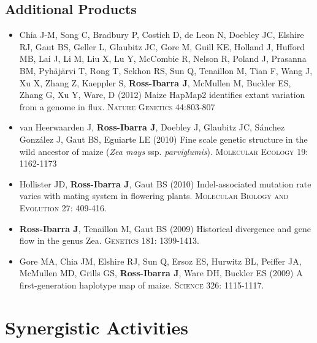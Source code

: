 \documentclass[11pt]{article}
\begin{document}
\subsection*{Additional Products}

\begin{itemize} \setlength{\itemsep}{0pt} \setlength{\parskip}{2pt} \setlength{\parsep}{0pt}

\item  Chia J-M, Song C, Bradbury P, Costich D, de Leon N, Doebley JC, Elshire RJ, Gaut BS, Geller L, Glaubitz JC, Gore M, Guill KE, Holland J,  {Hufford MB}, Lai J, Li M, Liu X, Lu Y, McCombie R, Nelson R, Poland J, Prasanna BM,  {Pyh\"aj\"arvi T}, Rong T, Sekhon RS,  Sun Q, Tenaillon M, Tian F, Wang J, Xu X, Zhang Z, Kaeppler S, {\bf Ross-Ibarra J}, McMullen M, Buckler ES, Zhang G, Xu Y, Ware, D (2012) Maize HapMap2 identifies extant variation from a genome in flux. \textsc{Nature Genetics} 44:803-807

\item {van Heerwaarden J}, {\bf Ross-Ibarra J}, Doebley J, Glaubitz JC, S\'{a}nchez Gonz\'{a}lez J, Gaut BS, Eguiarte LE (2010) Fine scale genetic structure in the wild ancestor of maize (\emph{Zea mays} ssp. \emph{parviglumis}).  \textsc{Molecular Ecology} 19: 1162-1173

\item Hollister JD, {\bf Ross-Ibarra J}, Gaut BS (2010) Indel-associated mutation rate varies with mating system in flowering plants.  \textsc{Molecular Biology and Evolution} 27: 409-416.

\item {\bf Ross-Ibarra J}, Tenaillon M, Gaut BS (2009) Historical divergence and gene flow in the genus Zea.  \textsc{Genetics} 181: 1399-1413.

\item Gore MA, Chia JM, Elshire RJ, Sun Q, Ersoz ES, Hurwitz BL, Peiffer JA, McMullen MD, Grills GS, {\bf Ross-Ibarra J}, Ware DH, Buckler ES (2009) A first-generation haplotype map of maize.  \textsc{Science 326}: 1115-1117.

\end{itemize}

\section{Synergistic Activities}
\end{document}

